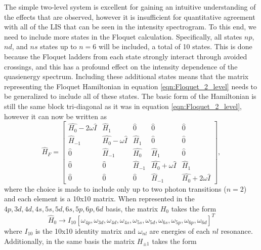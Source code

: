 The simple two-level system is excellent for gaining an intuitive understanding of the effects that are observed, however it is insufficient for quantitative agreement with all of the LIS that can be seen in the intensity spectrogram.  To this end, we need to include more states in the Floquet calculation.  Specifically, all states $np$, $nd$, and $ns$ states up to $n=6$ will be included, a total of 10 states.  This is done because the Floquet ladders from each state strongly interact through avoided crossings, and this has a profound effect on the intensity dependence of the quasienergy spectrum.  Including these additional states means that the matrix representing the Floquet Hamiltonian in equation \ref{eqn:Floquet_2_level} needs to be generalized to include all of these states.  The basic form of the Hamiltonian is still the same block tri-diagonal as it was in equation \ref{eqn:Floquet_2_level}, however it can now be written as 
\begin{equation}
\label{eqn:general_Floquet_matrix}
\hat{H}_{F}=
\left[
\begin{matrix}%
\hat{H_0}-2\omega\hat{I} & \hat{H}_1 & \hat{0} & \hat{0} & \hat{0} \\
\hat{H}_{-1} & \hat{H_0}-\omega\hat{I} & \hat{H}_1 & \hat{0} & \hat{0} \\
\hat{0} & \hat{H}_{-1} & \hat{H_0} & \hat{H}_1 & \hat{0} \\
\hat{0} & \hat{0} & \hat{H}_{-1} & \hat{H_0}+\omega\hat{I} & \hat{H}_1 \\
\hat{0} & \hat{0} & \hat{0} & \hat{H}_{-1} & \hat{H_0}+2\omega\hat{I} 
\end{matrix}
\right],
\end{equation}
where the choice is made to include only up to two photon transitions ($n=2$) and each element is a 10x10 matrix.  When represented in the $4p,3d,4d,4s,5s,5d,6s,5p,6p,6d$ basis, the matrix $H_0$ takes the form
\begin{equation}
\hat{H}_{0} \rightarrow I_{10} [\omega_{4p},\omega_{3d},\omega_{4d},\omega_{4s},\omega_{5s},\omega_{5d},\omega_{6s},\omega_{5p},\omega_{6p},\omega_{6d}]^T
\end{equation}
where $I_{10}$ is the 10x10 identity matrix and $\omega_{nl}$ are energies of each $nl$ resonance.  Additionally, in the same basis the matrix $H_{\pm1}$ takes the form
